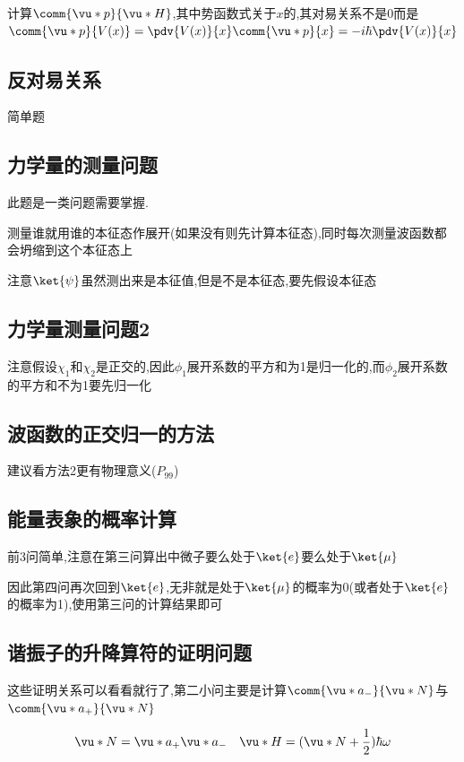             计算$\comm{\vu*{p}}{\vu*{H}}$,其中势函数式关于$x$的,其对易关系不是0而是$\comm{\vu*{p}}{V(x)} = \pdv{V(x)}{x} \comm{\vu*{p}}{x} = -i\hbar \pdv{V(x)}{x}$

        \subsection{反对易关系}
            简单题
        \subsection{力学量的测量问题}
            此题是一类问题需要掌握.
            \begin{formal}
                测量谁就用谁的本征态作展开(如果没有则先计算本征态),同时每次测量波函数都会坍缩到这个本征态上
            \end{formal}

            注意$\ket{\psi}$虽然测出来是本征值,但是不是本征态,要先假设本征态


        \subsection{力学量测量问题2}
            注意假设$\chi_{1}$和$\chi_{2}$是正交的,因此$\phi_{1}$展开系数的平方和为1是归一化的,而$\phi_{2}$展开系数的平方和不为1要先归一化

        \subsection{波函数的正交归一的方法}
            建议看方法2更有物理意义($P_{99}$)

        \subsection{能量表象的概率计算}
            前3问简单,注意在第三问算出中微子要么处于$\ket{e}$要么处于$\ket{\mu}$

            因此第四问再次回到$\ket{e}$,无非就是处于$\ket{\mu}$的概率为0(或者处于$\ket{e}$的概率为1),使用第三问的计算结果即可

        \subsection{谐振子的升降算符的证明问题}
            这些证明关系可以看看就行了,第二小问主要是计算$\comm{\vu*{a}_{-}}{\vu*{N}}$与$\comm{\vu*{a}_{+}}{\vu*{N}}$

            $$ \vu*{N} = \vu*{a}_{+} \vu*{a}_{-} \quad \vu*{H} = (\vu*{N} + \frac{1}{2}) \hbar \omega $$
